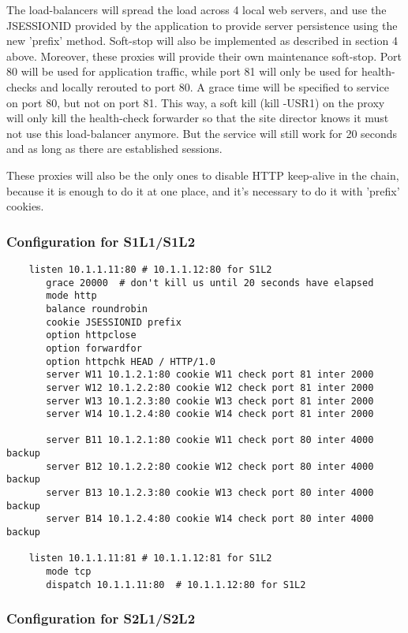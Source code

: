 The load-balancers will spread the load across 4 local web servers, and
use the JSESSIONID provided by the application to provide server persistence
using the new 'prefix' method. Soft-stop will also be implemented as described
in section 4 above. Moreover, these proxies will provide their own maintenance
soft-stop. Port 80 will be used for application traffic, while port 81 will
only be used for health-checks and locally rerouted to port 80. A grace time
will be specified to service on port 80, but not on port 81. This way, a soft
kill (kill -USR1) on the proxy will only kill the health-check forwarder so
that the site director knows it must not use this load-balancer anymore. But
the service will still work for 20 seconds and as long as there are established
sessions.

These proxies will also be the only ones to disable HTTP keep-alive in the
chain, because it is enough to do it at one place, and it's necessary to do
it with 'prefix' cookies.

\subsubsection{Configuration for S1L1/S1L2}

\begin{verbatim}
    listen 10.1.1.11:80 # 10.1.1.12:80 for S1L2
       grace 20000  # don't kill us until 20 seconds have elapsed
       mode http
       balance roundrobin
       cookie JSESSIONID prefix
       option httpclose
       option forwardfor
       option httpchk HEAD / HTTP/1.0
       server W11 10.1.2.1:80 cookie W11 check port 81 inter 2000
       server W12 10.1.2.2:80 cookie W12 check port 81 inter 2000
       server W13 10.1.2.3:80 cookie W13 check port 81 inter 2000
       server W14 10.1.2.4:80 cookie W14 check port 81 inter 2000

       server B11 10.1.2.1:80 cookie W11 check port 80 inter 4000 backup
       server B12 10.1.2.2:80 cookie W12 check port 80 inter 4000 backup
       server B13 10.1.2.3:80 cookie W13 check port 80 inter 4000 backup
       server B14 10.1.2.4:80 cookie W14 check port 80 inter 4000 backup

    listen 10.1.1.11:81 # 10.1.1.12:81 for S1L2
       mode tcp
       dispatch 10.1.1.11:80  # 10.1.1.12:80 for S1L2
\end{verbatim}

\subsubsection{Configuration for S2L1/S2L2}


